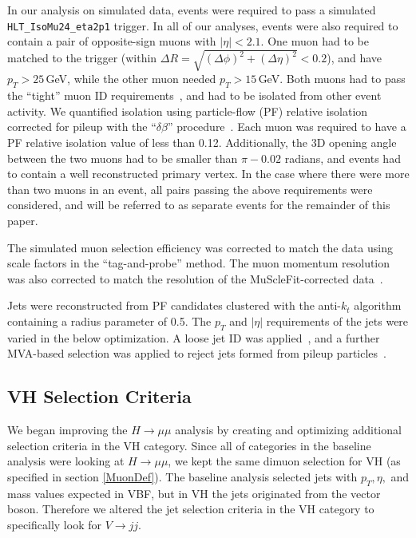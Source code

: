 \documentclass[12pt]{article}
\begin{document}
In our analysis on simulated data, events were required to pass a simulated \texttt{HLT\_IsoMu24\_eta2p1} trigger.
In all of our analyses, events were also required to contain a pair of opposite-sign muons with $|\eta|<2.1$.
One muon had to be matched to the trigger (within $\Delta R = \sqrt{(\Delta \phi)^2+(\Delta \eta)^2}< 0.2$), 
and have $p_T>25$\,GeV, while the other muon needed $p_T>15$\,GeV.
Both muons had to pass the ``tight'' muon ID requirements~\cite{AN2012_459},
and had to be isolated from other event activity.  We quantified isolation using
particle-flow (PF) relative isolation corrected for pileup with the ``$\delta \beta$''
procedure~\cite{AN2012_459}.  Each muon was required to have a PF relative isolation value
of less than 0.12.  Additionally, the 3D opening angle between the two muons had to be
smaller than $\pi-0.02$ radians, and events had to contain a well reconstructed primary
vertex.
In the case where there were more than two muons in an event, all pairs passing the above
requirements were considered, and will be referred to as separate events for the remainder
of this paper.  

The simulated muon selection efficiency was corrected to match the data using 
scale factors in the ``tag-and-probe'' method.  The muon momentum resolution
was also corrected to match the resolution of the MuScleFit-corrected data~\cite{AN2012_459}.

Jets were reconstructed from PF candidates clustered with the anti-$k_t$ algorithm containing
a radius parameter of 0.5.  The $p_T$ and $|\eta|$ requirements of the jets were varied in
the below optimization.  A loose jet ID was applied~\cite{AN2012_459}, and a further
MVA-based selection was applied to reject jets formed from pileup particles~\cite{PUID}.

\subsection{VH Selection Criteria}

We began improving the $H \rightarrow \mu \mu$ analysis by creating and optimizing additional selection criteria in the VH category. 
Since all of categories in the baseline analysis were looking at $H \rightarrow \mu \mu$, we kept the same dimuon 
selection for VH (as specified in section \ref{MuonDef}). 
The baseline analysis selected jets with $p_{T}, \eta,$ and mass values expected in VBF, but in VH the jets originated from the vector boson. 
Therefore we altered the jet selection criteria in the VH category to specifically look for $V \rightarrow jj$.
\end{document}
